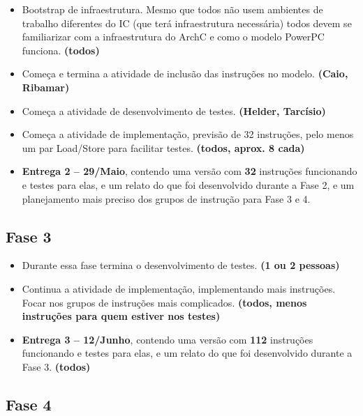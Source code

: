 \documentclass[twocolumn]{article}
\newcommand{\who}[1]{\textbf{ (#1)}}
\begin{document}
\begin{itemize}

\item Bootstrap de infraestrutura. Mesmo que todos não usem ambientes de
trabalho diferentes do IC (que terá infraestrutura necessária) todos devem se
familiarizar com a infraestrutura do ArchC e como o modelo PowerPC funciona.
\who{todos}

\item Começa e termina a atividade de inclusão das instruções no modelo.
\who{Caio, Ribamar}

\item Começa a atividade de desenvolvimento de testes. \who{Helder, Tarcísio}

\item Começa a atividade de implementação, previsão de 32 instruções, pelo
menos um par Load/Store para facilitar testes. \who{todos, aprox. 8 cada}

\item \textbf{Entrega 2 -- 29/Maio}, contendo uma versão com \textbf{32}
instruções funcionando e testes para elas, e um relato do que foi desenvolvido
durante a Fase 2, e um planejamento mais preciso dos grupos de instrução para
Fase 3 e 4.

\end{itemize}


\subsection{Fase 3}

\begin{itemize}

\item Durante essa fase termina o desenvolvimento de testes. \who{1 ou 2
pessoas}

\item Continua a atividade de implementação, implementando mais instruções.
Focar nos grupos de instruções mais complicados. \who{todos, menos instruções
para quem estiver nos testes}

\item \textbf{Entrega 3 -- 12/Junho}, contendo uma versão com \textbf{112}
instruções funcionando e testes para elas, e um relato do que foi desenvolvido
durante a Fase 3.\who{todos}

\end{itemize}


\subsection{Fase 4}
\end{document}
